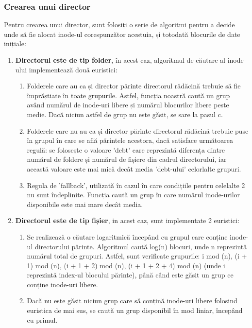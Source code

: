 \bigskip


\subsubsection{Crearea unui director}

Pentru crearea unui director, sunt folosiți o serie de algoritmi pentru a decide unde să fie alocat inode-ul corespunzător acestuia, și totodată blocurile de date inițiale:

\begin{enumerate}
  \item \textbf{Directorul este de tip folder}, în acest caz, algoritmul de căutare al inode-ului implementează două euristici:
  
  \begin{enumerate}
      \item Folderele care au ca și director părinte directorul rădăcină trebuie să fie împrăștiate în toate grupurile. Astfel, funcția noastră caută un grup având numărul de inode-uri libere și numărul blocurilor libere peste medie. Dacă niciun astfel de grup nu este găsit, se sare la pasul c.

      \item Folderele care nu au ca și director părinte directorul rădăcină trebuie puse în grupul în care se află părintele acestora, dacă satisface următoarea regulă: se folosește o valoare 'debt' care reprezintă diferența dintre numărul de foldere și numărul de fișiere din cadrul directorului, iar această valoare este mai mică decât media 'debt-ului' celorlalte grupuri.

      \item Regula de 'fallback', utilizată în cazul în care condițiile pentru celelalte 2 nu sunt îndeplinite. Funcția caută un grup în care numărul inode-urilor disponibile este mai mare decât media.
  \end{enumerate}

  \item \textbf{Directorul este de tip fișier}, in acest caz, sunt implementate 2 euristici:

  \begin{enumerate}
      \item Se realizează o căutare logaritmică începând cu grupul care conține inode-ul directorului părinte. Algoritmul caută log(n) blocuri, unde n reprezintă numărul total de grupuri. Astfel, sunt verificate grupurile: i mod (n), (i + 1) mod (n), (i + 1 + 2) mod (n), (i + 1 + 2 + 4) mod (n) (unde i reprezintă index-ul blocului părinte), până când este găsit un grup ce conține inode-uri libere.
      
      \item Dacă nu este găsit niciun grup care să conțină inode-uri libere folosind euristica de mai sus, se caută un grup disponibil în mod liniar, începând cu primul.
  \end{enumerate}

\end{enumerate}

